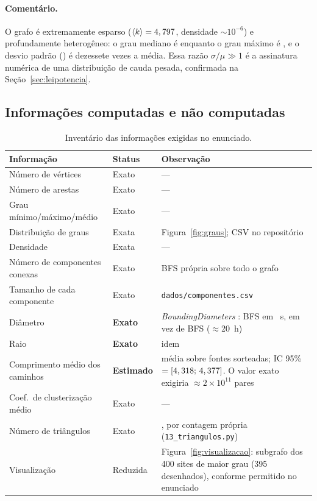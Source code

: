 \documentclass[sigconf]{webmedia}
\begin{document}
\paragraph{Comentário.} O grafo é extremamente esparso
($\langle k\rangle = 4,797{}$, densidade $\sim10^{-6}$) e
profundamente heterogêneo: o grau mediano é \grauMediano{} enquanto o grau
máximo é \grauMax{}, e o desvio padrão (\grauDesvio{}) é dezessete vezes a
média. Essa razão $\sigma/\mu \gg 1$ é a assinatura numérica de uma
distribuição de cauda pesada, confirmada na Seção~\ref{sec:leipotencia}.

\subsection{Informações computadas e não computadas}

\begin{table}[t]
\centering
\caption{Inventário das informações exigidas no enunciado.}
\label{tab:inventario}
\small
\begin{tabular}{llp{6.1cm}}
\hline
\textbf{Informação} & \textbf{Status} & \textbf{Observação} \\ \hline
Número de vértices            & Exato & --- \\
Número de arestas             & Exato & --- \\
Grau mínimo/máximo/médio      & Exato & --- \\
Distribuição de graus         & Exata & Figura~\ref{fig:graus}; CSV no repositório \\
Densidade                     & Exata & --- \\
Número de componentes conexas & Exato & BFS própria sobre todo o grafo \\
Tamanho de cada componente    & Exato & \texttt{dados/componentes.csv} \\
Diâmetro                      & \textbf{Exato} & \textit{BoundingDiameters} \cite{takes2011}: \bfsDiametro{} BFS em \tempoDiametro{}~s, em vez de \tamCG{} BFS ($\approx$20~h) \\
Raio                          & \textbf{Exato} & idem \\
Comprimento médio dos caminhos& \textbf{Estimado} & média sobre \caminhoMedioFontes{} fontes sorteadas; IC 95\% $=[4,318{};\,4,377{}]$. O valor exato exigiria $\approx2\times10^{11}$ pares \\
Coef.\ de clusterização médio & Exato & --- \\
Número de triângulos          & Exato & \numTriangulos{}, por contagem própria (\texttt{13\_triangulos.py}) \\
Visualização                  & Reduzida & Figura~\ref{fig:visualizacao}: subgrafo dos 400 sites de maior grau (395 desenhados), conforme permitido no enunciado \\
\hline
\end{tabular}
\end{table}
\end{document}
